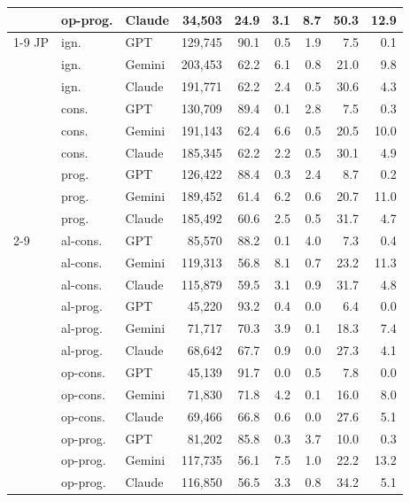\begin{table}[t]
\begin{tabular}{lllrrrrrr}
 & op-prog. & Claude & 34{,}503 & 24.9 & 3.1 & 8.7 & 50.3 & 12.9 \\
\cmidrule(lr){1-9}
JP & ign. & GPT & 129{,}745 & 90.1 & 0.5 & 1.9 & 7.5 & 0.1 \\
 & ign. & Gemini & 203{,}453 & 62.2 & 6.1 & 0.8 & 21.0 & 9.8 \\
 & ign. & Claude & 191{,}771 & 62.2 & 2.4 & 0.5 & 30.6 & 4.3 \\
 & cons. & GPT & 130{,}709 & 89.4 & 0.1 & 2.8 & 7.5 & 0.3 \\
 & cons. & Gemini & 191{,}143 & 62.4 & 6.6 & 0.5 & 20.5 & 10.0 \\
 & cons. & Claude & 185{,}345 & 62.2 & 2.2 & 0.5 & 30.1 & 4.9 \\
 & prog. & GPT & 126{,}422 & 88.4 & 0.3 & 2.4 & 8.7 & 0.2 \\
 & prog. & Gemini & 189{,}452 & 61.4 & 6.2 & 0.6 & 20.7 & 11.0 \\
 & prog. & Claude & 185{,}492 & 60.6 & 2.5 & 0.5 & 31.7 & 4.7 \\
\cmidrule(lr){2-9}
 & al-cons. & GPT & 85{,}570 & 88.2 & 0.1 & 4.0 & 7.3 & 0.4 \\
 & al-cons. & Gemini & 119{,}313 & 56.8 & 8.1 & 0.7 & 23.2 & 11.3 \\
 & al-cons. & Claude & 115{,}879 & 59.5 & 3.1 & 0.9 & 31.7 & 4.8 \\
 & al-prog. & GPT & 45{,}220 & 93.2 & 0.4 & 0.0 & 6.4 & 0.0 \\
 & al-prog. & Gemini & 71{,}717 & 70.3 & 3.9 & 0.1 & 18.3 & 7.4 \\
 & al-prog. & Claude & 68{,}642 & 67.7 & 0.9 & 0.0 & 27.3 & 4.1 \\
 & op-cons. & GPT & 45{,}139 & 91.7 & 0.0 & 0.5 & 7.8 & 0.0 \\
 & op-cons. & Gemini & 71{,}830 & 71.8 & 4.2 & 0.1 & 16.0 & 8.0 \\
 & op-cons. & Claude & 69{,}466 & 66.8 & 0.6 & 0.0 & 27.6 & 5.1 \\
 & op-prog. & GPT & 81{,}202 & 85.8 & 0.3 & 3.7 & 10.0 & 0.3 \\
 & op-prog. & Gemini & 117{,}735 & 56.1 & 7.5 & 1.0 & 22.2 & 13.2 \\
 & op-prog. & Claude & 116{,}850 & 56.5 & 3.3 & 0.8 & 34.2 & 5.1 \\
\bottomrule
\end{tabular}
\end{table}
